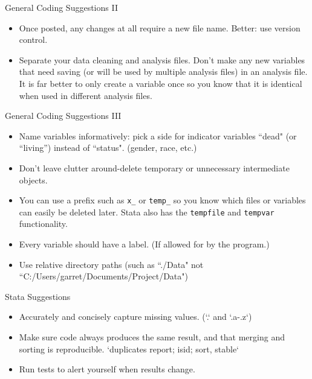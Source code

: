 \documentclass{beamer}
\begin{document}
\begin{frame}{General Coding Suggestions II}
\begin{itemize}
\item  Once posted, any changes at all require a new file name. Better: use version control.  

\item  Separate your data cleaning and analysis files. Don't make any new variables that need saving (or will be used by multiple analysis files) in an analysis file. It is far better to only create a variable once so you know that it is identical when used in different analysis files.
\end{itemize}
\end{frame}


\begin{frame}{General Coding Suggestions III}
\begin{itemize}

\item  Name variables informatively: pick a side for indicator variables ``dead" (or ``living'') instead of ``status". (gender, race, etc.)

\item Don't leave clutter around-delete temporary or unnecessary intermediate objects. 

\item You can use a prefix such as \texttt{x\_} or \texttt{temp\_} so you know which files or variables can easily be deleted later. Stata also has the \texttt{tempfile} and \texttt{tempvar} functionality.  

\item Every variable should have a label. (If allowed for by the program.)

\item  Use relative directory paths (such as ``./Data" not ``C:/Users/garret/Documents/Project/Data") 

\end{itemize}
\end{frame}


\begin{frame}{Stata Suggestions}
\begin{itemize}
\item Accurately and concisely capture missing values. (`.` and `.a-.z`)

\item Make sure code always produces the same result, and that merging and sorting is reproducible. `duplicates report; isid; sort, stable`  

\item	Run tests to alert yourself when results change. 
\end{itemize}
\end{frame}
\end{document}
